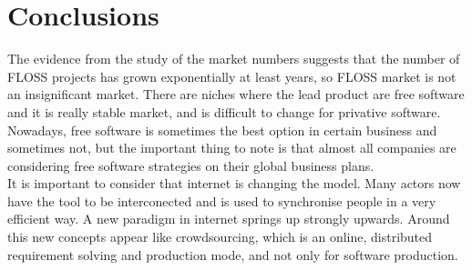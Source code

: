 \section{Conclusions}\label{conclusions}
The evidence from the study of the market numbers suggests that the number of FLOSS projects has grown exponentially at least years, so FLOSS market is not an insignificant market. There are niches where the lead product are free software and it is really stable market, and is difficult to change for privative software.
\\
Nowadays, free software is sometimes the best option in certain business and sometimes not, but the important thing to note is that almost all companies are considering free software strategies on their global business plans. 
\\
It is important to consider that internet is changing the model. Many actors now have the tool to be interconected and is used to synchronise people in a very efficient way. A new paradigm in internet springs up strongly upwards. Around this new concepts appear like crowdsourcing, which is an online, distributed requirement solving and production mode, and not only for software production.
 
